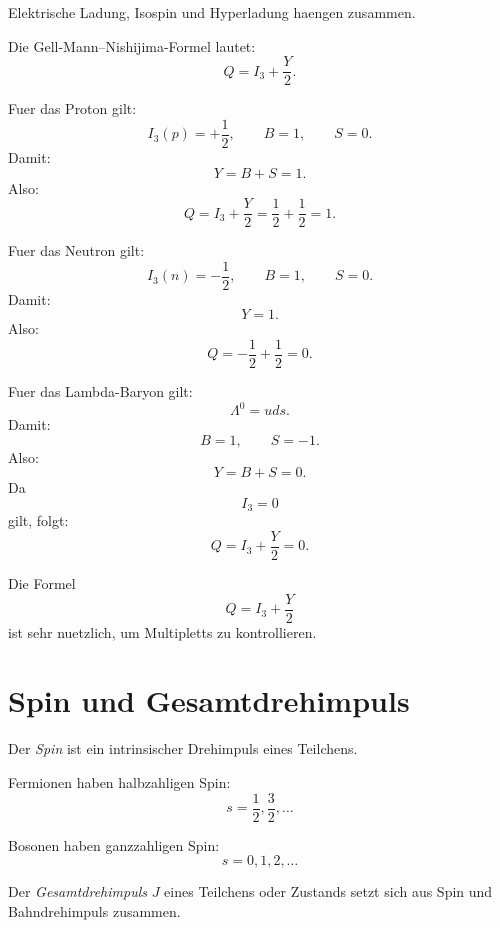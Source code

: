 Elektrische Ladung, Isospin und Hyperladung haengen zusammen.

\begin{formulabox}
Die Gell-Mann--Nishijima-Formel lautet:
\[
    Q = I_3 + \frac{Y}{2}.
\]
\end{formulabox}

\begin{examplebox}
Fuer das Proton gilt:
\[
    I_3(p)=+\frac{1}{2},
    \qquad
    B=1,
    \qquad
    S=0.
\]
Damit:
\[
    Y=B+S=1.
\]
Also:
\[
    Q
    =
    I_3+\frac{Y}{2}
    =
    \frac{1}{2}
    +
    \frac{1}{2}
    =
    1.
\]
\end{examplebox}

\begin{examplebox}
Fuer das Neutron gilt:
\[
    I_3(n)=-\frac{1}{2},
    \qquad
    B=1,
    \qquad
    S=0.
\]
Damit:
\[
    Y=1.
\]
Also:
\[
    Q
    =
    -\frac{1}{2}
    +
    \frac{1}{2}
    =
    0.
\]
\end{examplebox}

\begin{examplebox}
Fuer das Lambda-Baryon gilt:
\[
    \Lambda^0=uds.
\]
Damit:
\[
    B=1,
    \qquad
    S=-1.
\]
Also:
\[
    Y=B+S=0.
\]
Da
\[
    I_3=0
\]
gilt, folgt:
\[
    Q=I_3+\frac{Y}{2}=0.
\]
\end{examplebox}

\begin{examtipbox}
Die Formel
\[
    Q=I_3+\frac{Y}{2}
\]
ist sehr nuetzlich, um Multipletts zu kontrollieren.
\end{examtipbox}

\section{Spin und Gesamtdrehimpuls}

\begin{definitionbox}
Der \emph{Spin} ist ein intrinsischer Drehimpuls eines Teilchens.
\end{definitionbox}

\begin{conceptbox}
Fermionen haben halbzahligen Spin:
\[
    s=\frac{1}{2},\frac{3}{2},\ldots
\]

Bosonen haben ganzzahligen Spin:
\[
    s=0,1,2,\ldots
\]
\end{conceptbox}

\begin{definitionbox}
Der \emph{Gesamtdrehimpuls} $J$ eines Teilchens oder Zustands setzt sich aus Spin
und Bahndrehimpuls zusammen.
\end{definitionbox}

